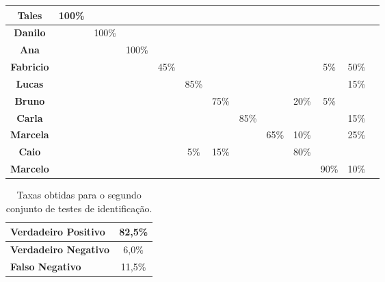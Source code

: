 \begin{table}[htb]
\begin{center}
\begin{tabular}{|c|c|c|c|c|c|c|c|c|c|c|c|c|}
				\hline \bf Tales 			&100\% & 			& 		 & 			&   	 & 			& 		& 		&	 		& 		& 		\\
				\hline \bf Danilo 		& 		 &100\%	& 		 & 			&   	 & 			& 		& 		& 		& 		& 		 		\\
				\hline \bf Ana 				& 		 & 			& 100\%& 			&   	 & 			& 		& 		& 		& 		& 		    \\
				\hline \bf Fabricio 	& 		 & 			& 		 &45\%	&      & 			& 		& 		& 		& 5\%	& 50\%    		\\
				\hline \bf Lucas 			& 		 & 			& 		 & 			& 85\% & 			& 		& 		& 		& 		& 15\%		\\
				\hline \bf Bruno 			& 		 & 			& 		 & 			& 		 & 75\% & 	  & 		&20\% & 5\%	& 		  	\\
				\hline \bf Carla 			& 		 & 			& 		 & 			& 		 & 			&85\% &		  & 	  & 		& 15\%		  	\\
				\hline \bf Marcela 		& 		 & 			& 		 & 			& 		 &      & 		&65\% &10\% & 		& 25\%		  	\\
				\hline \bf Caio 		  & 		 & 			& 		 & 			& 	5\%& 	15\%& 		& 		&80\%	&	 		& 		  	\\
				\hline \bf Marcelo 		& 		 & 			& 		 & 			& 		 & 			& 		& 		& 		& 90\%& 10\%		  	\\
				\hline
			\end{tabular}
		\end{center}
	\end{table}

	\begin{table}[htb]
		\begin{center}
			\caption{Taxas obtidas para o segundo conjunto de testes de identificação.}
			\label{tab:taxas2}
			\begin{tabular}{|l|c|}
				\hline \bf Verdadeiro Positivo & 82,5\% \\
				\hline \bf Verdadeiro Negativo & 6,0\% \\
				\hline \bf Falso Negativo & 11,5\% \\
				\hline
			\end{tabular}
		\end{center}
	\end{table}


